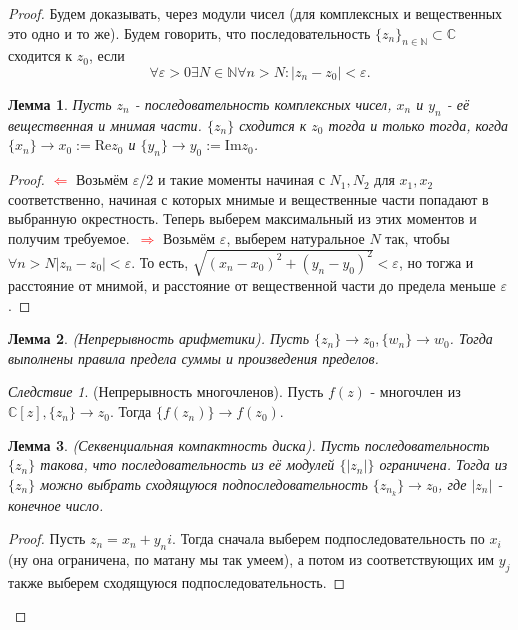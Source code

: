 \documentclass[a4paper,100pt]{article}
\theoremstyle{indented}
\newtheorem{lemma}{Лемма}
\theoremstyle{definition}
\theoremstyle{remark}
\newtheorem{cons}{Следствие}
\begin{document}
\begin{proof}
    Будем доказывать, через модули чисел (для комплексных и вещественных это одно и то же). Будем говорить, что последовательность $\{z_n\}_{n\in\mathbb{N}}\subset \mathbb{C}$ сходится к $z_0$, если 
    \[
        \forall \varepsilon >0 \exists N\in \mathbb{N} \forall n>N:\vert z_n-z_0\vert <\varepsilon.
    \]

    \begin{lemma}
        Пусть $z_n$ - последовательность комплексных чисел, $x_n$ и $y_n$ - её вещественная и мнимая части. $\{z_n\}$ сходится к $z_0$ тогда и только тогда, когда $\{x_n\}\rightarrow x_0:=\text{Re}z_0$ и $\{y_n\}\rightarrow y_0:=\text{Im}z_0$.
    \end{lemma}

    \begin{proof}
        \textcolor{red}{$\Leftarrow$} Возьмём $\varepsilon/2$ и такие моменты начиная с $N_1, N_2$ для $x_1, x_2$ соответственно, начиная с которых мнимые и вещественные части попадают в выбранную окрестность. Теперь выберем максимальный из этих моментов и получим требуемое.\ 
        \textcolor{red}{$\Rightarrow$} Возьмём $\varepsilon$, выберем натуральное $N$ так, чтобы $\forall n >N \vert z_n-z_0\vert <\varepsilon$. То есть, $\sqrt{(x_n-x_0)^2+(y_n-y_0)^2}<\varepsilon$, но тогжа и расстояние от мнимой, и расстояние от вещественной части до предела меньше $\varepsilon$.
    \end{proof}

    \begin{lemma}
        (Непрерывность арифметики). Пусть $\{z_n\}\rightarrow z_0, \{w_n\}\rightarrow w_0$. Тогда выполнены правила предела суммы и произведения пределов.
    \end{lemma}

    \begin{cons}
        (Непрерывность многочленов). Пусть $f(z)$ - многочлен из $\mathbb{C}[z], \{z_n\}\rightarrow z_0$. Тогда $\{f(z_n)\}\rightarrow f(z_0)$.
    \end{cons}

    \begin{lemma}
        (Секвенциальная компактность диска). Пусть последовательность $\{z_n\}$ такова, что последовательность из её модулей $\{\vert z_n\vert\}$ ограничена. Тогда из $\{z_n\}$ можно выбрать сходящуюся подпоследовательность $\{z_{n_k}\}\rightarrow z_0$, где $\vert z_n\vert$ - конечное число.
    \end{lemma}

    \begin{proof}
        Пусть $z_n=x_n+y_n i$. Тогда сначала выберем подпоследовательность по $x_i$ (ну она ограничена, по матану мы так умеем), а потом из соответствующих им $y_j$ также выберем сходящуюся подпоследовательность.
    \end{proof}


\end{proof}
\end{document}
